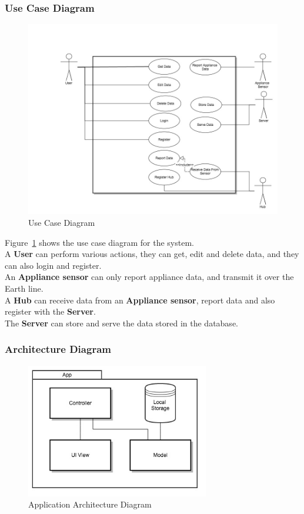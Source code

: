 \documentclass[preprint,12pt,3p]{elsarticle}
\begin{document}
\subsubsection{Use Case Diagram}
\begin{figure}[H]
    \includegraphics[width=\columnwidth]{diagrams/UseCase}
    \caption {Use Case Diagram}
    \label{fig:usecaseoverall}
\end{figure}
Figure~\ref{fig:usecaseoverall} shows the use case diagram for the system.\\
A \textbf{User} can perform various actions, they can get, edit and delete data, and they can also login and register.\\
An \textbf{Appliance sensor} can only report appliance data, and transmit it over the Earth line.\\
A \textbf{Hub} can receive data from an \textbf{Appliance sensor}, report data and also register with the \textbf{Server}.\\
The \textbf{Server} can store and serve the data stored in the database.

\subsubsection{Architecture Diagram}
\begin{figure}[H]
    \centering
    \includegraphics[width=8cm]{diagrams/app}
    \caption {Application Architecture Diagram}
\end{figure}
\end{document}
